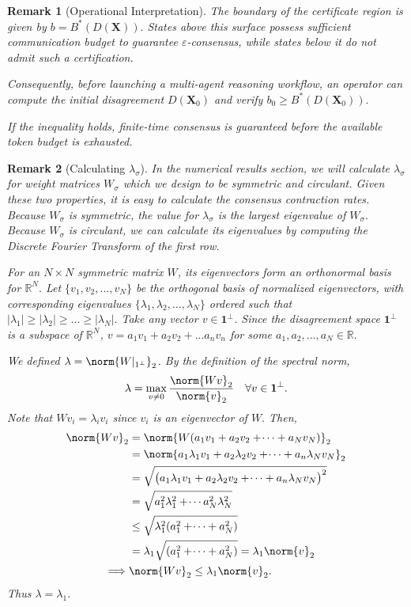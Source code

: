 \documentclass[journal,twoside,web]{ieeecolor_no_firstpage_logo}
\newtheorem{remark}{Remark}
\begin{document}
\begin{remark}[Operational Interpretation]

The boundary of the certificate region is given by $b=B^* (D(\mathbf{X})).$ States above this surface possess sufficient communication budget to guarantee $\varepsilon$-consensus, while states below it do not admit such a certification.

Consequently, before launching a multi-agent reasoning workflow,
an operator can compute the initial disagreement $D(\mathbf{X}_0)$ and verify 
$
b_0\ge B^*(D(\mathbf{X}_0)).
$

If the inequality holds, finite-time consensus is guaranteed before
the available token budget is exhausted.
\end{remark}

\begin{remark} [Calculating $\lambda_\sigma$]
In the numerical results section, we will calculate $\lambda_\sigma$ for weight matrices $W_\sigma$ which we design to be symmetric and circulant. Given these two properties, it is easy to calculate the consensus contraction rates. Because $W_\sigma$ is symmetric, the value for $\lambda_\sigma$ is the largest eigenvalue of $W_\sigma.$ Because $W_\sigma$ is circulant, we can calculate its eigenvalues by computing the Discrete Fourier Transform of the first row. 

For an $N \times N$ symmetric matrix $W$, its eigenvectors form an orthonormal basis for $\mathbb{R}^N.$ Let $\{v_1, v_2,...,v_N\}$ be the orthogonal basis of normalized eigenvectors, with corresponding eigenvalues $\{\lambda_1, \lambda_2,..., \lambda_N\}$ ordered such that $|\lambda_1| \geq |\lambda_2| \geq ...\geq|\lambda_N|.$ Take any vector $v \in \mathbf 1^\perp$. Since the disagreement space $\mathbf 1^\perp$ is a subspace of $\mathbb{R}^N$, $v = a_1v_1+a_2v_2+...a_nv_n$ for some $a_1,a_2,...,a_N \in \mathbb{R}.$ 

We defined $\lambda = \norm{W|_{1^\perp}}_2$. By the definition of the spectral norm, 
$$
\lambda = \max_{v \neq 0} \frac{\norm{Wv}_2}{\norm{v}_2} \quad \forall v \in \mathbf 1^\perp.
$$
Note that $Wv_i = \lambda_iv_i$ since $v_i$ is an eigenvector of $W.$ Then,
\begin{align*}
\norm{Wv}_2 & = \norm{W(a_1v_1+a_2v_2+\dotsi+a_Nv_N)}_2 \\
& = \norm{a_1 \lambda_1 v_1 + a_2\lambda_2v_2+\dotsi+a_n\lambda_Nv_N}_2 \\
& = \sqrt{\big(a_1 \lambda_1 v_1 + a_2\lambda_2v_2+\dotsi+a_n\lambda_Nv_N\big)^2} \\
& = \sqrt{a_1^2\lambda_1^2+\dotsi a_N^2\lambda_N^2} \\
&\leq \sqrt{\lambda_1^2(a_1^2+\dotsi + a_N^2)} \\
& = \lambda_1 \sqrt{(a_1^2 + \dotsi + a_N^2)} = \lambda_1 \norm{v}_2 \\
\implies & \norm{Wv}_2 \leq \lambda_1 \norm{v}_2.
\end{align*}
Thus $\lambda = \lambda_1.$ 


\end{remark}
\end{document}
